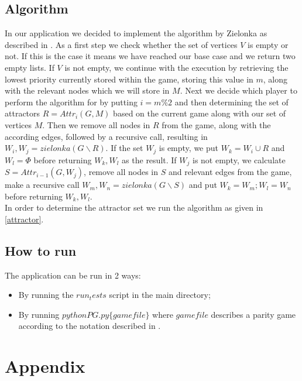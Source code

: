 \documentclass[12pt]{article}
\begin{document}
\subsection{Algorithm}
In our application we decided to implement the algorithm by Zielonka as described in \cite[~p28]{zielonka}. As a first step we check whether the set of vertices $V$ is empty or not. If this is the case it means we have reached our base case and we return two empty lists. If $V$ is not empty, we continue with the execution by retrieving the lowest priority currently stored within the game, storing this value in $m$, along with the relevant nodes which we will store in $M$. Next we decide which player to perform the algorithm for by putting $i = m\%2$ and then determining the set of attractors $R = Attr_i(G, M)$ based on the current game along with our set of vertices $M$. Then we remove all nodes in $R$ from the game, along with the according edges, followed by a recursive call, resulting in $W_i, W_j = zielonka(G \backslash R)$. If the set $W_j$ is empty, we put $W_k = W_i \cup R$ and $W_l = \Phi$ before returning $W_k, W_l$ as the result. If $W_j$ is not empty, we calculate $S = Attr_{i-1}(G, W_j)$, remove all nodes in $S$ and relevant edges from the game, make a recursive call $W_m, W_n = zielonka(G\backslash S)$ and put $W_k = W_m; W_l = W_n$ before returning $W_k, W_l$.\\
In order to determine the attractor set we run the algorithm as given in \ref{attractor}.


\subsection{How to run}
The application can be run in 2 ways:
\begin{itemize}
	\item By running the \texttt{$run_tests$} script in the main directory;
	\item By running \texttt{$python PG.py \{gamefile\}$} where $gamefile$ describes a parity game according to the notation described in \cite[~p32]{format}.
\end{itemize}
\newpage

\section{Appendix}
\end{document}
